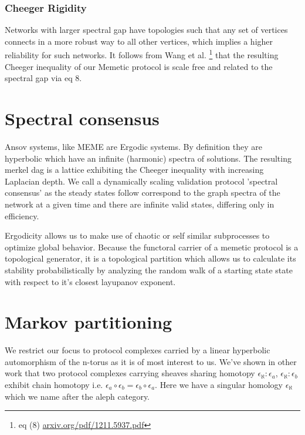 \documentclass{article}
\begin{document}
\subsubsection{Cheeger Rigidity}
Networks with larger spectral gap have topologies such that any set of vertices connects in a more robust way to all other vertices, which implies a higher reliability for such networks. It follows from Wang et al. \footnote{eq (8) \url{arxiv.org/pdf/1211.5937.pdf}} that the resulting Cheeger inequality of our Memetic protocol is scale free and related to the spectral gap via eq 8. 

\section{Spectral consensus}
Ansov systems, like MEME are Ergodic systems. By definition they are hyperbolic which have an infinite (harmonic) spectra of solutions. The resulting merkel dag is a lattice exhibiting the Cheeger inequality with increasing Laplacian depth. We call a dynamically scaling validation protocol 'spectral consensus' as the steady states follow correspond to the graph spectra of the network at a given time and there are infinite valid states, differing only in efficiency.

Ergodicity allows us to make use of chaotic or self similar subprocesses to optimize global behavior. Because the functoral carrier of a memetic protocol is a topological generator, it is a topological partition which allows us to calculate its stability probabilistically by analyzing the random walk of a starting state state with respect to it's closest layupanov exponent. 

\section{Markov partitioning}
We restrict our focus to protocol complexes carried by a linear hyperbolic automorphism of the n-torus as it is of most interest to us. We've shown in other work that two protocol complexes carrying sheaves sharing homotopy $\epsilon_{\aleph}: \epsilon_a$, $\epsilon_{\aleph}: \epsilon_b$ exhibit chain homotopy i.e. $\epsilon_a \circ \epsilon_b = \epsilon_b \circ \epsilon_a$. Here we have a singular homology $\epsilon_{\aleph}$ which we name after the aleph category. 
\end{document}
